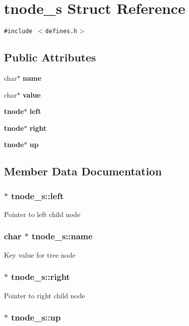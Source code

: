 \section{tnode\_\-s  Struct Reference}
\label{structtnode__s}
{\tt \#include $<$defines.h$>$}

\subsection*{Public Attributes}
\begin{CompactItemize}
\item 
char$\ast$ {\bf name}
\item 
char$\ast$ {\bf value}
\item 
{\bf tnode}$\ast$ {\bf left}
\item 
{\bf tnode}$\ast$ {\bf right}
\item 
{\bf tnode}$\ast$ {\bf up}
\end{CompactItemize}


\subsection{Member Data Documentation}
\subsubsection{ $\ast$ tnode\_\-s::left}\label{structtnode__s_m2}


Pointer to left child node 
\subsubsection{\setlength{\rightskip}{0pt plus 5cm}char $\ast$ tnode\_\-s::name}\label{structtnode__s_m0}


Key value for tree node 
\subsubsection{ $\ast$ tnode\_\-s::right}\label{structtnode__s_m3}


Pointer to right child node 
\subsubsection{ $\ast$ tnode\_\-s::up}\label{structtnode__s_m4}


